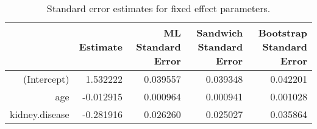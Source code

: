 \begin{table}[ht]
\centering
\begingroup\small
\begin{tabular}{rrrrr}
  \toprule
 & Estimate & ML Standard Error & Sandwich Standard Error & Bootstrap Standard Error \\ 
  \midrule
(Intercept) & 1.532222 & 0.039557 & 0.039348 & 0.042201 \\ 
  age & -0.012915 & 0.000964 & 0.000941 & 0.001028 \\ 
  kidney.disease & -0.281916 & 0.026260 & 0.025027 & 0.035864 \\ 
   \bottomrule
\end{tabular}
\endgroup
\caption{Standard error estimates for fixed effect parameters.} 
\label{tab:standard_errors_no_interaction}
\end{table}

